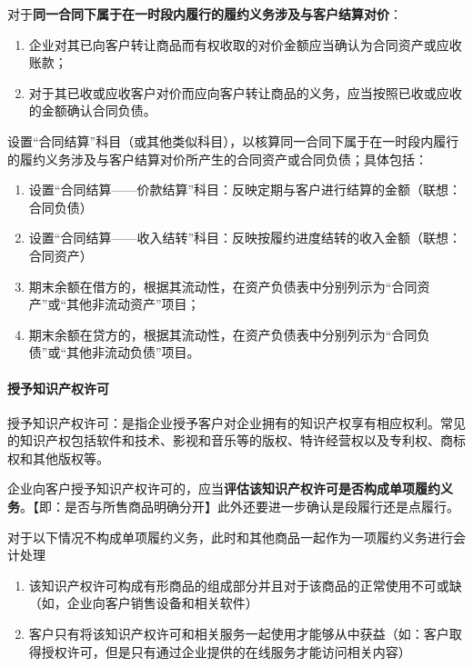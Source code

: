 \documentclass[UTF8,12pt]{ctexart}
\numberwithin{equation}{section} %
\numberwithin{figure}{section}
\numberwithin{table}{section}
\begin{document}
	对于\textbf{同一合同下属于在一时段内履行的履约义务涉及与客户结算对价}：
	\begin{enumerate}
		\item 企业对其已向客户转让商品而有权收取的对价金额应当确认为合同资产或应收账款；
		
		\item 对于其已收或应收客户对价而应向客户转让商品的义务，应当按照已收或应收的金额确认合同负债。
	\end{enumerate}
	
	设置“合同结算”科目（或其他类似科目），以核算同一合同下属于在一时段内履行的履约义务涉及与客户结算对价所产生的合同资产或合同负债；具体包括：
	\begin{enumerate}
		\item 设置“合同结算——价款结算”科目：反映定期与客户进行结算的金额（联想：合同负债）
		
		\item 设置“合同结算——收入结转”科目：反映按履约进度结转的收入金额（联想：合同资产）
		
		\item 期末余额在借方的，根据其流动性，在资产负债表中分别列示为“合同资产”或“其他非流动资产”项目；
		
		\item 期末余额在贷方的，根据其流动性，在资产负债表中分别列示为“合同负债”或“其他非流动负债”项目。
	\end{enumerate}
	
	
	
	\paragraph{授予知识产权许可}
	
	授予知识产权许可：是指企业授予客户对企业拥有的知识产权享有相应权利。常见的知识产权包括软件和技术、影视和音乐等的版权、特许经营权以及专利权、商标权和其他版权等。
	
	企业向客户授予知识产权许可的，应当\textbf{评估该知识产权许可是否构成单项履约义务}。【即：是否与所售商品明确分开】此外还要进一步确认是段履行还是点履行。
	
	对于以下情况不构成单项履约义务，此时和其他商品一起作为一项履约义务进行会计处理
	\begin{enumerate}
		\item 该知识产权许可构成有形商品的组成部分并且对于该商品的正常使用不可或缺（如，企业向客户销售设备和相关软件）
		
		\item 客户只有将该知识产权许可和相关服务一起使用才能够从中获益（如：客户取得授权许可，但是只有通过企业提供的在线服务才能访问相关内容）
	\end{enumerate}
	
\end{document}

